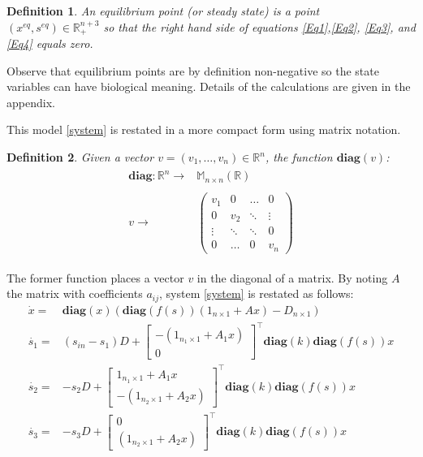 \documentclass[3p,times]{elsarticle}
\newcommand{\R}{\mathbb{R}}
\newcommand{\diag}{\textbf{diag}}
\newtheorem{defn}{Definition}
\begin{document}
\begin{defn} 
	An equilibrium point (or steady state) is a point $(x^{eq},s^{eq}) \in \R^{n+3}_+$ so that the right hand side of equations \eqref{Eq1},\eqref{Eq2}, \eqref{Eq3}, and \eqref{Eq4} equals zero. 
\end{defn} 

Observe that equilibrium points are by definition non-negative so the state variables can have biological meaning. Details of the calculations are given in the appendix. 

This model \eqref{system} is restated in a more compact form using matrix notation.

\begin{defn} Given a vector $v=(v_1,\dots, v_n)\in \R^n$, the function $\diag(v)$:
	\begin{align}
	\begin{array}{rc}
	\diag:\R^n \rightarrow & \mathbb{M}_{n\times n}(\R)\\
	& \\
	v \rightarrow & \begin{pmatrix}
	v_1 & 0 & \dots & 0 \\
	0 & v_2 & \ddots & \vdots\\ 
	\vdots & \ddots & \ddots& 0 \\
	0 & \dots &0 & v_n 
	\end{pmatrix}
	\end{array}
	\end{align}
\end{defn}

The former function places a vector $v$ in the diagonal of a matrix. By noting $A$ the matrix with coefficients $a_{ij}$, system \eqref{system} is restated as follows:
\begin{align}
\label{Eq1}	\dot{x} = & \diag(x)(\diag(f(s))(1_{n\times 1} + Ax) - D_{n\times 1}) \\
\label{Eq2}	\dot{s_1} = & (s_{in}-s_1)D + \begin{bmatrix}
-(1_{n_1\times 1} +A_1x) \\0
\end{bmatrix}^\top \diag(k) \diag(f(s))x \\
\label{Eq3}	\dot{s_2} = & -s_2D+
\begin{bmatrix}
1_{n_1\times 1} +A_1x \\ -(1_{n_2\times 1} +A_2x)
\end{bmatrix}^\top \diag(k) \diag(f(s))x \\	
\label{Eq4}	\dot{s_3} = & -s_3D+\begin{bmatrix}
0	\\(1_{n_2\times 1} +A_2x) 
\end{bmatrix}^\top \diag(k) \diag(f(s))x 
\end{align} 
\end{document}
